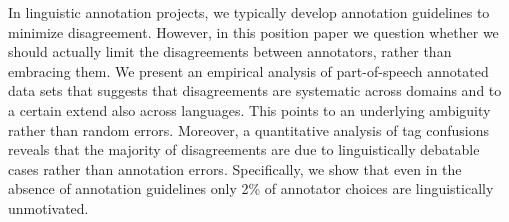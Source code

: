 In linguistic annotation projects, we typically develop annotation guidelines to minimize disagreement. However, in this position paper we question whether we should actually limit the disagreements between annotators, rather than embracing them. We present an empirical analysis of part-of-speech annotated data sets that suggests that disagreements are systematic across domains and to a certain extend also across languages. This points to an underlying ambiguity rather than random errors. Moreover, a quantitative analysis of tag confusions reveals that the majority of disagreements are due to linguistically debatable cases rather than annotation errors. Specifically, we show that even in the absence of annotation guidelines only 2\% of annotator choices are linguistically unmotivated.
